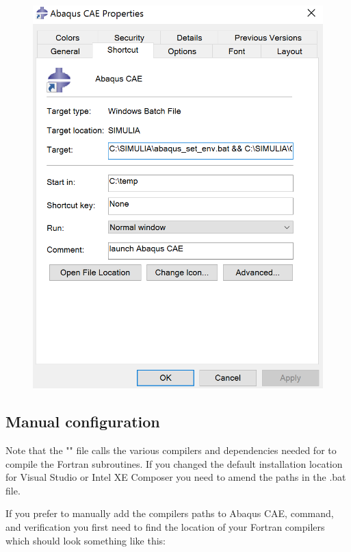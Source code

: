 \documentclass[10pt,a4paper,oneside]{article}
\begin{document}
\begin{figure}[!h]
\centering
\includegraphics[scale=0.7]{abaqus_CAE.png} 
\caption{}
\label{fig:CAEpath}
\end{figure}

\subsection{Manual configuration}
Note that the "" file calls the various compilers and dependencies needed for to compile the Fortran subroutines. If you changed the default installation location for Visual Studio or Intel XE Composer  you need to amend the paths in the .bat file. 

If you prefer to manually add the compilers paths to Abaqus CAE, command, and verification you first need to find the location of your Fortran compilers which should look something like this: 

{}\newline
{}
\bigbreak
\end{document}
